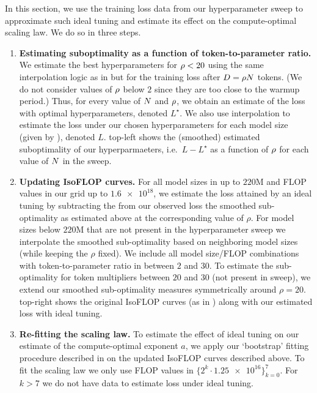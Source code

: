 \documentclass{article}
\theoremstyle{plain}
\theoremstyle{definition}
\theoremstyle{remark}
\newcommand{\maybeSubscript}[1]{
  \ifthenelse{\equal{#1}{}}{}{_{#1}}%
}
\newcommand{\params}[1][]{N\maybeSubscript{#1}}
\newcommand{\tokens}[1][]{D\maybeSubscript{#1}}
\newcommand{\ratio}[1][]{\rho\maybeSubscript{#1}}
\newcommand{\loss}{L}
\newcommand{\nExp}{a}
\begin{document}
In this section, we use the training loss data from our hyperparameter sweep to approximate such ideal tuning and estimate its effect on the compute-optimal scaling law. We do so in three steps.
\begin{enumerate}[leftmargin=*]
    \item \textbf{Estimating suboptimality as a function of token-to-parameter ratio.} We estimate the best hyperparameters for $\ratio < 20$ using the same interpolation logic as in  but for the training loss after $\tokens=\ratio \params$ tokens. (We do not consider values of $\ratio$ below $2$ since they are too close to the warmup period.) 
    Thus, for every value of $\params$ and $\ratio$, we obtain an estimate of the loss with optimal hyperparameters, denoted $\loss^\star$. We also use interpolation to estimate the loss under our chosen hyperparameters for each model size (given by ), denoted $\loss$.  top-left shows the (smoothed) estimated suboptimality of our hyperparmaeters, i.e.\ $\loss-\loss^\star$ as a function of $\ratio$ for each value of $\params$ in the sweep. 
    \item \textbf{Updating IsoFLOP curves.} For all model sizes in  up to $220$M and FLOP values in our grid up to $\num{1.6e18}$, we estimate the loss attained by an ideal tuning by subtracting the from our observed loss the smoothed sub-optimality as estimated above at the corresponding value of $\rho$. For model sizes below $220$M that are not present in the hyperparameter sweep we interpolate the smoothed sub-optimality based on neighboring model sizes (while keeping the $\rho$ fixed). We include all model size/FLOP combinations with token-to-parameter ratio in between $2$ and $30$. To estimate the sub-optimality for token multipliers between $20$ and $30$ (not present in sweep), we extend our smoothed sub-optimality measures symmetrically around $\rho=20$.  top-right shows the original IsoFLOP curves (as in ) along with our estimated loss with ideal tuning. 
    \item \textbf{Re-fitting the scaling law.} To estimate the effect of ideal tuning on our estimate of the compute-optimal exponent $\nExp$, we apply our `bootstrap' fitting procedure described in  on the updated IsoFLOP curves described above. To fit the scaling law we only use FLOP values in $\{2^{k} \cdot \num{1.25e16}\}_{k=0}^7$. For $k>7$ we do not have data to estimate loss under ideal tuning. 
\end{enumerate}
\end{document}

